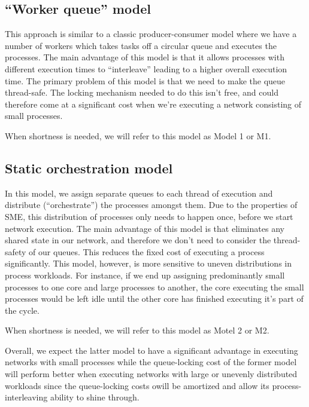 
\subsection{``Worker queue'' model}
This approach is similar to a classic producer-consumer model where we
have a number of workers which takes tasks off a circular queue and
executes the processes. The main advantage of this model is that it
allows processes with different execution times to ``interleave''
leading to a higher overall execution time. The primary problem of
this model is that we need to make the queue thread-safe. The locking
mechanism needed to do this isn't free, and could therefore come at a
significant cost when we're executing a network consisting of small
processes.

When shortness is needed, we will refer to this model as Model 1 or M1.

\subsection{Static orchestration model}
In this model, we assign separate queues to each thread of execution
and distribute (``orchestrate'') the processes amongst them. Due to
the properties of SME, this distribution of processes only needs to
happen once, before we start network execution. The main advantage of
this model is that eliminates any shared state in our network, and
therefore we don't need to consider the thread-safety of our
queues. This reduces the fixed cost of executing a process
significantly. This model, however, is more sensitive to uneven
distributions in process workloads. For instance, if we end up
assigning predominantly small processes to one core and large
processes to another, the core executing the small processes would be
left idle until the other core has finished executing it's part of the
cycle.

When shortness is needed, we will refer to this model as Motel 2 or M2.

Overall, we expect the latter model to have a significant advantage in
executing networks with small processes while the queue-locking cost
of the former model will perform better when executing networks with
large or unevenly distributed workloads since the queue-locking costs
owill be amortized and allow its process-interleaving ability to shine
through.


